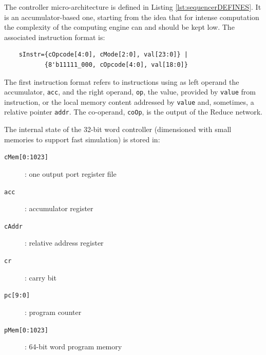 The controller micro-architecture is defined in Listing \ref{lst:sequencerDEFINES}. It is an accumulator-based one, starting from the idea that for intense computation the complexity of the computing engine can and should be kept low.  The associated instruction format is: 
\begin{verbatim}
    sInstr={cOpcode[4:0], cMode[2:0], val[23:0]} | 
           {8'b11111_000, cOpcode[4:0], val[18:0]}
\end{verbatim}
The first instruction format refers to instructions using as left operand the accumulator, {\tt acc},  and the right operand, {\tt op}, the value, provided by {\tt value} from instruction, or the local memory content addressed by {\tt value} and, sometimes, a relative pointer {\tt addr}. The co-operand, {\tt coOp}, is the output of the Reduce network.

The internal state of the 32-bit word controller (dimensioned with small memories to support fast simulation) is stored in:
\begin{description}
    \item[{\tt cMem[0:1023]}]: one output port register file
    \item[{\tt acc}]: accumulator register
    \item[{\tt cAddr}]: relative address register
    \item[{\tt cr}]: carry bit
    \item[{\tt pc[9:0]}]: program counter
    \item[{\tt pMem[0:1023]}]: 64-bit word program memory
\end{description}



